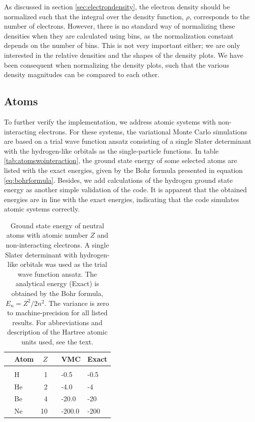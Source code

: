 As discussed in section \ref{sec:electrondensity}, the electron density should be normalized such that the integral over the density function, $\rho$, corresponds to the number of electrons. However, there is no standard way of normalizing these densities when they are calculated using bins, as the normalization constant depends on the number of bins. This is not very important either; we are only interested in the relative densities and the shapes of the density plots. We have been consequent when normalizing the density plots, such that the various density magnitudes can be compared to each other.

\subsection{Atoms}
To further verify the implementation, we address atomic systems with non-interacting electrons. For these systems, the variational Monte Carlo simulations are based on a trial wave function ansatz consisting of a single Slater determinant with the hydrogen-like orbitals as the single-particle functions. In table \eqref{tab:atomswointeraction}, the ground state energy of some selected atoms are listed with the exact energies, given by the Bohr formula presented in equation \eqref{eq:bohrformula}. Besides, we add calculations of the hydrogen ground state energy as another simple validation of the code. It is apparent that the obtained energies are in line with the exact energies, indicating that the code simulates atomic systems correctly.

\begin{table}
	\caption{Ground state energy of neutral atoms with atomic number $Z$ and non-interacting electrons. A single Slater determinant with hydrogen-like orbitals was used as the trial wave function ansatz. The analytical energy (Exact) is obtained by the Bohr formula, $E_n=Z^2/2n^2$. The variance is zero to machine-precision for all listed results. For abbreviations and description of the Hartree atomic units used, see the text.}
	\label{tab:atomswointeraction}
	\begin{tabularx}{\textwidth}{R{3.5cm}lrrR{2.5cm}R{2.5cm}} \hline\hline
		& Atom & $Z$ & \makecell{\\ \phantom{=}} & VMC & Exact \\ \hline \\
		
		& H & 1 && -0.5 & -0.5 \\
		& He & 2 && -4.0 & -4 \\
		& Be & 4 && -20.0 & -20 \\
		& Ne & 10 && -200.0 & -200 \\ \hline\hline
	\end{tabularx}
\end{table}

